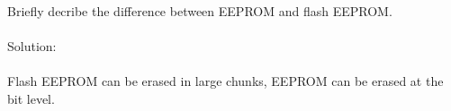 Briefly decribe the difference between EEPROM and flash EEPROM.\\ \\

Solution: \\ \\
Flash EEPROM can be erased in large chunks, EEPROM can be erased at the bit level.\\
